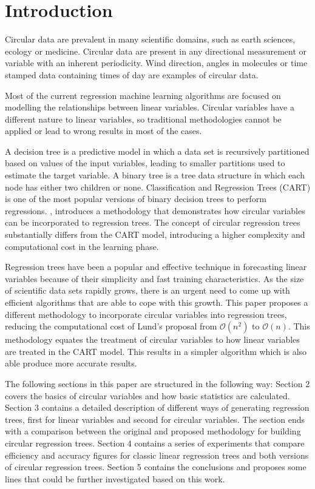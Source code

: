 \documentclass[times,twocolumn,final,authoryear]{elsarticle}
\begin{document}

\section{Introduction}
\label{intro}
Circular data are prevalent in many scientific domains, such as earth sciences, ecology or medicine. Circular data are present in any directional measurement or variable with an inherent periodicity. Wind direction, angles in molecules or time stamped data containing times of day are examples of circular data.

Most of the current regression machine learning algorithms are focused on modelling the relationships between linear variables. Circular variables have a different nature to linear variables, so traditional methodologies cannot be applied or lead to wrong results in most of the cases.

A decision tree is a predictive model in which a data set is recursively partitioned based on values of the input variables, leading to smaller partitions used to estimate the target variable. A binary tree is a tree data structure in which each node has either two children or none. Classification and Regression Trees (CART) \citep{Breimanetal1984} is one of the most popular versions of binary decision trees to perform regressions. \citep{Lund2002}, introduces a methodology that demonstrates how circular variables can be incorporated to regression trees. The concept of circular regression trees substantially differs from the CART model, introducing a higher complexity and computational cost in the learning phase. 

Regression trees have been a popular and effective technique in forecasting linear variables because of their simplicity and fast training characteristics. As the size of scientific data sets rapidly grows, there is an urgent need to come up with efficient algorithms that are able to cope with this growth. This paper proposes a different methodology to incorporate circular variables into regression trees, reducing the computational cost of Lund's proposal from $\mathcal{O}(n^2)$ to $\mathcal{O}(n)$. This methodology equates the treatment of circular variables to how linear variables are treated in the CART model. This results in a simpler algorithm which is also able produce more accurate results.

The following sections in this paper are structured in the following way: Section 2 covers the basics of circular variables and how basic statistics are calculated. Section 3 contains a detailed description of different ways of generating regression trees, first for linear variables and second for circular variables. The section ends with a comparison between the original and proposed methodology for building circular regression trees. Section 4 contains a series of experiments that compare efficiency and accuracy figures for classic linear regression trees and both versions of circular regression trees. Section 5 contains the conclusions and proposes some lines that could be further investigated based on this work.
\end{document}
